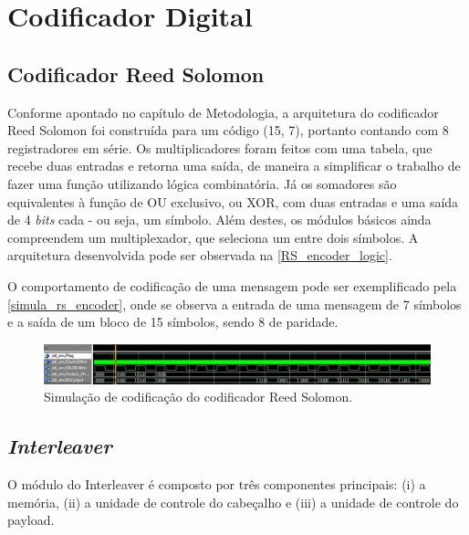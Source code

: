 	\section{Codificador Digital}

	\subsection{Codificador Reed Solomon}

	Conforme apontado no capítulo de Metodologia, a arquitetura do codificador Reed Solomon foi construída para um código (15, 7), portanto contando com 8 registradores em série. Os multiplicadores foram feitos com uma tabela,  que recebe duas entradas e retorna uma saída, de maneira a simplificar o trabalho de fazer uma função utilizando lógica combinatória. Já os somadores são equivalentes à função de OU exclusivo, ou XOR, com duas entradas e uma saída de 4 \textit{bits} cada - ou seja, um símbolo. Além destes, os módulos básicos ainda compreendem um multiplexador, que seleciona um entre dois símbolos. A arquitetura desenvolvida pode ser observada na \autoref{RS_encoder_logic}.

	O comportamento de codificação de uma mensagem pode ser exemplificado pela \autoref{simula_rs_encoder}, onde se observa a entrada de uma mensagem de 7 símbolos e a saída de um bloco de 15 símbolos, sendo 8 de paridade.

	\begin{figure}[h]
		\caption{\label{simula_rs_encoder}Simulação de codificação do codificador Reed Solomon.}
		\centering
		\includegraphics[width=1\textwidth]{RS/Sim_encoder}
	\end{figure}

	\subsection{\textit{Interleaver}}

	O módulo do Interleaver é composto por três componentes principais: (i) a memória, (ii) a unidade de controle do cabeçalho e (iii) a unidade de controle do payload.

